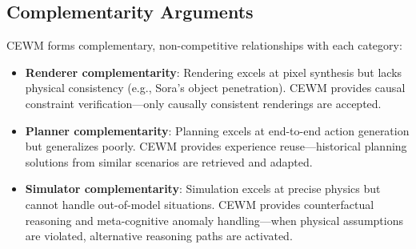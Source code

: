 \documentclass[11pt,a4paper]{article}
\newcommand{\CEWM}{\textsc{CEWM}}
\begin{document}
\subsection{Complementarity Arguments}

\CEWM{} forms complementary, non-competitive relationships with each category:
\begin{itemize}[nosep]
  \item \textbf{Renderer complementarity}: Rendering excels at pixel synthesis but lacks physical consistency (e.g., Sora's object penetration). \CEWM{} provides causal constraint verification---only causally consistent renderings are accepted.
  \item \textbf{Planner complementarity}: Planning excels at end-to-end action generation but generalizes poorly. \CEWM{} provides experience reuse---historical planning solutions from similar scenarios are retrieved and adapted.
  \item \textbf{Simulator complementarity}: Simulation excels at precise physics but cannot handle out-of-model situations. \CEWM{} provides counterfactual reasoning and meta-cognitive anomaly handling---when physical assumptions are violated, alternative reasoning paths are activated.
\end{itemize}

\end{document}
